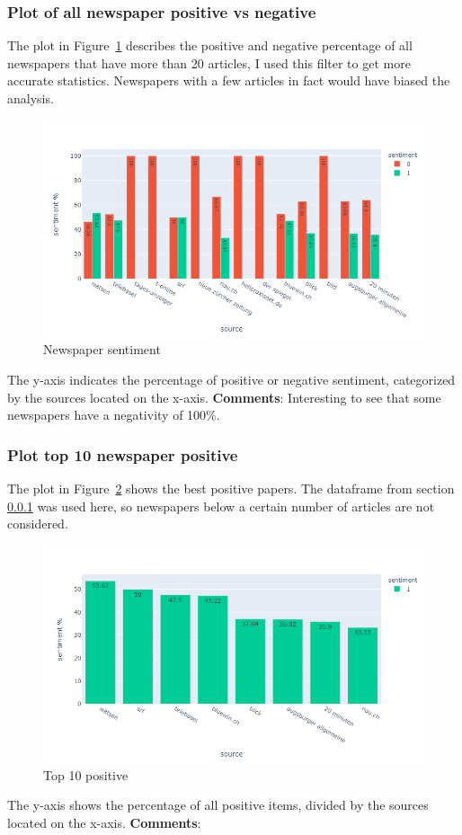 \subsubsection{Plot of all newspaper positive vs negative}
\label{chap:allposneg}
The plot in Figure~\ref{fig:fig_all} describes the positive and negative percentage of all newspapers that have more than 20 articles, I used this filter to get more accurate statistics. Newspapers with a few articles in fact would have biased the analysis.
\begin{figure}[H]
\centering
\includegraphics[width=1\textwidth]{images/output_79_0.png}
\caption{Newspaper sentiment}
\label{fig:fig_all}
\end{figure}
\FloatBarrier
The y-axis indicates the percentage of positive or negative sentiment, categorized by the sources located on the x-axis.
\textbf{Comments}:
Interesting to see that some newspapers have a negativity of 100\%.

\subsubsection{Plot top 10 newspaper positive}
The plot in Figure~\ref{fig:fig_10pos} shows the best positive papers. The dataframe from section \ref{chap:allposneg} was used here, so newspapers below a certain number of articles are not considered.
\begin{figure}[H]
\centering
\includegraphics[width=1\textwidth]{images/output_85_0.png}
\caption{Top 10 positive}
\label{fig:fig_10pos}
\end{figure}
\FloatBarrier
The y-axis shows the percentage of all positive items, divided by the sources located on the x-axis.
\textbf{Comments}:

